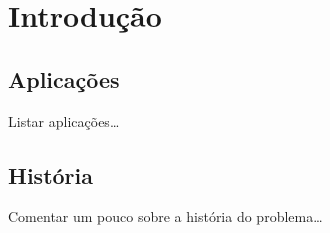 \chapter{Introdução}
\label{chap:introducao}

\section{Aplicações}

Listar aplicações\dots

\section{História}

Comentar um pouco sobre a história do problema\dots
